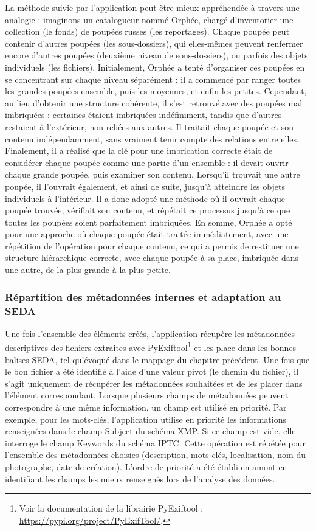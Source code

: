 La méthode suivie par l'application peut être mieux appréhendée à travers une analogie : imaginons un catalogueur nommé Orphée, chargé d'inventorier une collection (le fonds) de poupées russes (les reportages). Chaque poupée peut contenir d'autres poupées (les sous-dossiers), qui elles-mêmes peuvent renfermer encore d'autres poupées (deuxième niveau de sous-dossiers), ou parfois des objets individuels (les fichiers). Initialement, Orphée a tenté d'organiser ces poupées en se concentrant sur chaque niveau séparément : il a commencé par ranger toutes les grandes poupées ensemble, puis les moyennes, et enfin les petites. Cependant, au lieu d'obtenir une structure cohérente, il s'est retrouvé avec des poupées mal imbriquées : certaines étaient imbriquées indéfiniment, tandis que d'autres restaient à l'extérieur, non reliées aux autres. Il traitait chaque poupée et son contenu indépendamment, sans vraiment tenir compte des relations entre elles. Finalement, il a réalisé que la clé pour une imbrication correcte était de considérer chaque poupée comme une partie d'un ensemble : il devait ouvrir chaque grande poupée, puis examiner son contenu. Lorsqu'il trouvait une autre poupée, il l'ouvrait également, et ainsi de suite, jusqu'à atteindre les objets individuels à l'intérieur. Il a donc adopté une méthode où il ouvrait chaque poupée trouvée, vérifiait son contenu, et répétait ce processus jusqu'à ce que toutes les poupées soient parfaitement imbriquées. En somme, Orphée a opté pour une approche où chaque poupée était traitée immédiatement, avec une répétition de l'opération pour chaque contenu, ce qui a permis de restituer une structure hiérarchique correcte, avec chaque poupée à sa place, imbriquée dans une autre, de la plus grande à la plus petite.

\subsubsection*{Répartition des métadonnées internes et adaptation au SEDA}

Une fois l'ensemble des éléments  créés, l'application récupère les métadonnées descriptives des fichiers extraites avec PyExiftool\footnote{Voir la documentation de la librairie PyExiftool : \url{https://pypi.org/project/PyExifTool/}.} et les place dans les bonnes balises SEDA, tel qu'évoqué dans le mappage du chapitre précédent. Une fois que le bon fichier a été identifié à l'aide d'une valeur pivot (le chemin du fichier), il s’agit uniquement de récupérer les métadonnées souhaitées et de les placer dans l’élément correspondant. Lorsque plusieurs champs de métadonnées peuvent correspondre à une même information, un champ est utilisé en priorité. Par exemple, pour les mots-clés, l’application utilise en priorité les informations renseignées dans le champ Subject du schéma XMP. Si ce champ est vide, elle interroge le champ Keywords du schéma IPTC. Cette opération est répétée pour l’ensemble des métadonnées choisies (description, mots-clés, localisation, nom du photographe, date de création). L'ordre de priorité a été établi en amont en identifiant les champs les mieux renseignés lors de l'analyse des données. 

